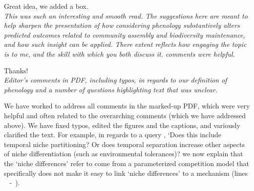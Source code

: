 \documentclass[11pt]{article}
\newcommand{\lr}[1]{~\lineref{#1}}
\begin{document}
Great idea, we added a box. \\

\emph{This was such an interesting and smooth read. The suggestions here are meant to help sharpen the presentation of how considering phenology substantively alters predicted outcomes related to community assembly and biodiversity maintenance, and how such insight
can be applied. There extent reflects how engaging the topic is to me, and the skill with which you both discuss it. comments were helpful.}

Thanks!\\

\emph{Editor's comments in PDF, including typos, in regards to our definition of phenology and a number of questions highlighting text that was unclear. } 

We have worked to address all comments in the marked-up PDF, which were very helpful and often related to the overarching comments (which we have addressed above). We have fixed typos, edited the figures and the captions, and variously clarified the text. For example, in regards to a query  \citep[in reference to][]{godoy2014}, `Does this include temporal niche partitioning?  Or does temporal separation increase other aspects of niche differentiation (such as environmental tolerances)? we now explain that the `niche differences' \citet{godoy2014} refer to come from a parameterized competition model that specifically does not make it easy to link `niche differences' to a mechanism (lines \lr{whatnicheS} -\lr{whatnicheE}).


\end{document}
